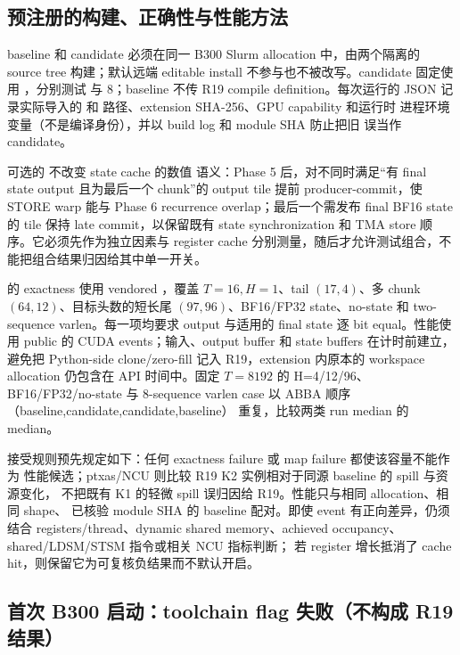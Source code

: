 \subsection{预注册的构建、正确性与性能方法}

baseline 和 candidate 必须在同一 B300 Slurm allocation 中，由两个隔离的 source
tree 构建；默认远端 editable install 不参与也不被改写。candidate 固定使用
，分别测试
 与 \(8\)；baseline 不传
R19 compile definition。每次运行的 JSON 记录实际导入的  和
 路径、extension SHA-256、GPU capability 和运行时
进程环境变量（不是编译身份），并以 build log 和 module SHA 防止把旧  误当作 candidate。

可选的  不改变 state cache 的数值
语义：Phase 5 后，对不同时满足“有 final state output 且为最后一个 chunk”的
output tile 提前 producer-commit，使 STORE warp 能与 Phase 6 recurrence
overlap；最后一个需发布 final BF16 state 的 tile 保持 late commit，以保留既有
state synchronization 和 TMA store 顺序。它必须先作为独立因素与 register cache
分别测量，随后才允许测试组合，不能把组合结果归因给其中单一开关。

 的 exactness 使用 vendored ，覆盖
\(T=16,H=1\)、tail \((17,4)\)、多 chunk \((64,12)\)、目标头数的短长尾
\((97,96)\)、BF16/FP32 state、no-state 和 two-sequence varlen。每一项均要求
output 与适用的 final state 逐 bit equal。性能使用 public 
的 CUDA events；输入、output buffer 和 state buffers 在计时前建立，避免把
Python-side clone/zero-fill 记入 R19，extension 内原本的 workspace allocation
仍包含在 API 时间中。固定 \(T=8192\) 的 H=4/12/96、BF16/FP32/no-state 与
8-sequence varlen case 以 ABBA 顺序（baseline,candidate,candidate,baseline）
重复，比较两类 run median 的 median。

接受规则预先规定如下：任何 exactness failure 或 map failure 都使该容量不能作为
性能候选；ptxas/NCU 则比较 R19 K2 实例相对于同源 baseline 的 spill 与资源变化，
不把既有 K1 的轻微 spill 误归因给 R19。性能只与相同 allocation、相同 shape、
已核验 module SHA 的 baseline 配对。即使 event 有正向差异，仍须结合 registers/thread、dynamic
shared memory、achieved occupancy、shared/LDSM/STSM 指令或相关 NCU 指标判断；
若 register 增长抵消了 cache hit，则保留它为可复核负结果而不默认开启。

\subsection{首次 B300 启动：toolchain flag 失败（不构成 R19 结果）}


